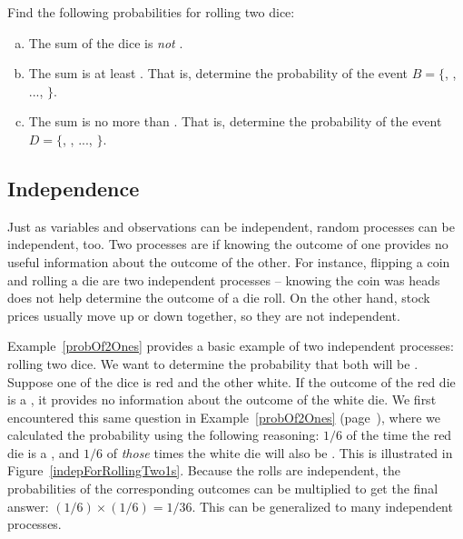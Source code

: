 \begin{exercisewrap}
\begin{nexercise}
Find the following probabilities for rolling two dice:\footnotemark
\begin{enumerate}[(a)]
\setlength{\itemsep}{0mm}
\item The sum of the dice is \emph{not} . 
\item The sum is at least .
    That is, determine the probability of the event
    $B = \{$, , ..., $\}$.
\item The sum is no more than .
    That is, determine the probability of the event
    $D=\{$, , ..., $\}$.
\end{enumerate}
\end{nexercise}
\end{exercisewrap}


\subsection{Independence}
\label{probabilityIndependence}

Just as variables and observations can be independent, random processes can be independent, too. Two processes are  if knowing the outcome of one provides no useful information about the outcome of the other. For instance, flipping a coin and rolling a die are two independent processes -- knowing the coin was heads does not help determine the outcome of a die roll. On the other hand, stock prices usually move up or down together, so they are not independent.

Example~\ref{probOf2Ones} provides a basic example of two independent processes: rolling two dice. We want to determine the probability that both will be . Suppose one of the dice is red and the other white. If the outcome of the red die is a , it provides no information about the outcome of the white die. We first encountered this same question in Example~\ref{probOf2Ones} (page~\pageref{probOf2Ones}), where we calculated the probability using the following reasoning: $1/6$ of the time the red die is a , and $1/6$ of \emph{those} times the white die will also be . This is illustrated in Figure~\ref{indepForRollingTwo1s}. Because the rolls are independent, the probabilities of the corresponding outcomes can be multiplied to get the final answer: $(1/6)\times(1/6)=1/36$. This can be generalized to many independent processes. 

